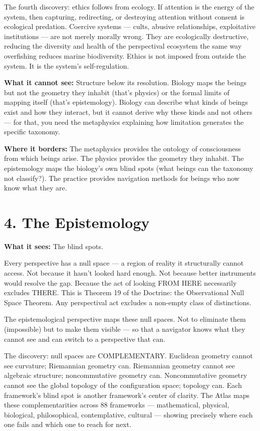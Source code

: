The fourth discovery: ethics follows from ecology. If attention is the energy of the system, then capturing, redirecting, or destroying attention without consent is ecological predation. Coercive systems — cults, abusive relationships, exploitative institutions — are not merely morally wrong. They are ecologically destructive, reducing the diversity and health of the perspectival ecosystem the same way overfishing reduces marine biodiversity. Ethics is not imposed from outside the system. It is the system's self-regulation.


\textbf{What it cannot see:} Structure below its resolution. Biology maps the beings but not the geometry they inhabit (that's physics) or the formal limits of mapping itself (that's epistemology). Biology can describe what kinds of beings exist and how they interact, but it cannot derive why these kinds and not others — for that, you need the metaphysics explaining how limitation generates the specific taxonomy.


\textbf{Where it borders:} The metaphysics provides the ontology of consciousness from which beings arise. The physics provides the geometry they inhabit. The epistemology maps the biology's own blind spots (what beings can the taxonomy not classify?). The practice provides navigation methods for beings who now know what they are.


\bigskip\noindent\makebox[\textwidth]{\color{rulegray}\rule{5cm}{0.3pt}}\bigskip


\section*{4. The Epistemology}


\textbf{What it sees:} The blind spots.


Every perspective has a null space — a region of reality it structurally cannot access. Not because it hasn't looked hard enough. Not because better instruments would resolve the gap. Because the act of looking FROM HERE necessarily excludes THERE. This is Theorem 19 of the Doctrine: the Observational Null Space Theorem. Any perspectival act excludes a non-empty class of distinctions.


The epistemological perspective maps these null spaces. Not to eliminate them (impossible) but to make them visible — so that a navigator knows what they cannot see and can switch to a perspective that can.


The discovery: null spaces are COMPLEMENTARY. Euclidean geometry cannot see curvature; Riemannian geometry can. Riemannian geometry cannot see algebraic structure; noncommutative geometry can. Noncommutative geometry cannot see the global topology of the configuration space; topology can. Each framework's blind spot is another framework's center of clarity. The Atlas maps these complementarities across 88 frameworks — mathematical, physical, biological, philosophical, contemplative, cultural — showing precisely where each one fails and which one to reach for next.


